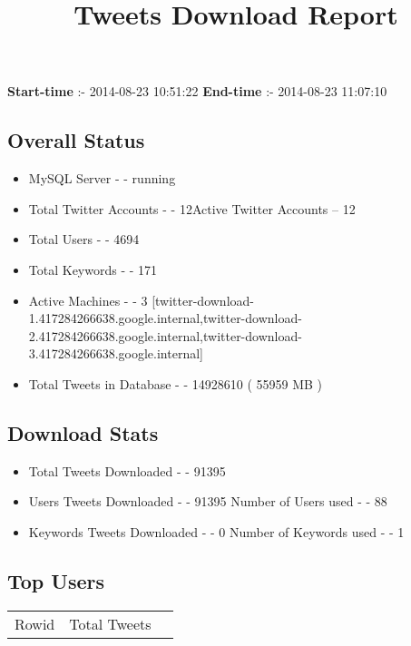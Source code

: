 \documentclass{article}\usepackage[T1]{fontenc}
\begin{document}
\title{\textbf{Tweets Download Report}}
               \date{}
                \maketitle
               \centerline{\textbf{Start-time} :- 2014-08-23 10:51:22 \hspace{40pt} \textbf{End-time} :- 2014-08-23 11:07:10}               \subsection*{Overall Status}                \begin{itemize}                \item MySQL Server - - running               \item Total Twitter Accounts - - 12\newline Active Twitter Accounts -- 12               \item Total Users - - 4694               \item Total Keywords - - 171               \item Active Machines - - 3 [twitter-download-1.417284266638.google.internal,twitter-download-2.417284266638.google.internal,twitter-download-3.417284266638.google.internal]               \item Total Tweets in Database - - 14928610 ( 55959 MB )               \end{itemize}               \subsection*{Download Stats}                \begin{itemize}                \item Total Tweets Downloaded - - 91395               \item Users Tweets Downloaded - - 91395 \newline Number of Users used - - 88               \item Keywords Tweets Downloaded - - 0 \newline Number of Keywords used - - 1              \end{itemize}              \subsection*{Top Users}\begin{tabular}{|c|c|c|}         \hline         Rowid & Total Tweets \\ 

\end{tabular}
\end{document}
